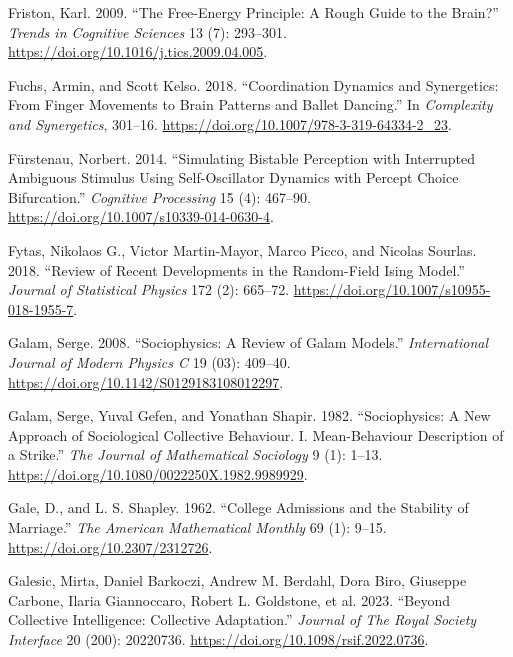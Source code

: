 \documentclass[
  a4paper,
  DIV=11,
  numbers=noendperiod,
  oneside]{scrreprt}
\newlength{\cslhangindent}
\newenvironment{CSLReferences}[2] %
 {\begin{list}{}{%
  \setlength{\itemindent}{0pt}
  \setlength{\leftmargin}{0pt}
  \setlength{\parsep}{0pt}
  \ifodd #1
   \setlength{\leftmargin}{\cslhangindent}
   \setlength{\itemindent}{-1\cslhangindent}
  \fi
  \setlength{\itemsep}{#2\baselineskip}}}
 {\end{list}}
\begin{document}
\begin{CSLReferences}{1}{0}
Friston, Karl. 2009. {``The Free-Energy Principle: A Rough Guide to the
Brain?''} \emph{Trends in Cognitive Sciences} 13 (7): 293--301.
\url{https://doi.org/10.1016/j.tics.2009.04.005}.

Fuchs, Armin, and Scott Kelso. 2018. {``Coordination {Dynamics} and
{Synergetics}: {From Finger Movements} to {Brain Patterns} and {Ballet
Dancing}.''} In \emph{Complexity and {Synergetics}}, 301--16.
\url{https://doi.org/10.1007/978-3-319-64334-2_23}.

Fürstenau, Norbert. 2014. {``Simulating Bistable Perception with
Interrupted Ambiguous Stimulus Using Self-Oscillator Dynamics with
Percept Choice Bifurcation.''} \emph{Cognitive Processing} 15 (4):
467--90. \url{https://doi.org/10.1007/s10339-014-0630-4}.

Fytas, Nikolaos G., Victor Martin-Mayor, Marco Picco, and Nicolas
Sourlas. 2018. {``Review of Recent Developments in the Random-Field
{Ising} Model.''} \emph{Journal of Statistical Physics} 172 (2):
665--72. \url{https://doi.org/10.1007/s10955-018-1955-7}.

Galam, Serge. 2008. {``Sociophysics: A Review of Galam Models.''}
\emph{International Journal of Modern Physics C} 19 (03): 409--40.
\url{https://doi.org/10.1142/S0129183108012297}.

Galam, Serge, Yuval Gefen, and Yonathan Shapir. 1982. {``Sociophysics:
{A} New Approach of Sociological Collective Behaviour. {I}.
Mean-Behaviour Description of a Strike.''} \emph{The Journal of
Mathematical Sociology} 9 (1): 1--13.
\url{https://doi.org/10.1080/0022250X.1982.9989929}.

Gale, D., and L. S. Shapley. 1962. {``College {Admissions} and the
{Stability} of {Marriage}.''} \emph{The American Mathematical Monthly}
69 (1): 9--15. \url{https://doi.org/10.2307/2312726}.

Galesic, Mirta, Daniel Barkoczi, Andrew M. Berdahl, Dora Biro, Giuseppe
Carbone, Ilaria Giannoccaro, Robert L. Goldstone, et al. 2023. {``Beyond
Collective Intelligence: {Collective} Adaptation.''} \emph{Journal of
The Royal Society Interface} 20 (200): 20220736.
\url{https://doi.org/10.1098/rsif.2022.0736}.


\end{CSLReferences}
\end{document}
